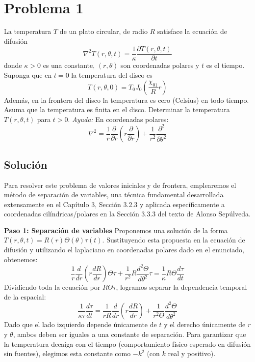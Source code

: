 \documentclass[a4paper]{article}
\begin{document}
\section{Problema 1}
La temperatura $T$ de un plato circular, de radio $R$ satisface la ecuación de difusión
$$
\nabla^2T(r,\theta,t) = \frac{1}{\kappa}\frac{\partial T(r,\theta,t)}{\partial t}
$$
donde $\kappa > 0$ es una constante, $(r,\theta)$ son coordenadas polares y $t$ es el tiempo. Suponga que en $t = 0$ la temperatura del disco es
$$T(r,\theta,0) = T_0 J_0\left(\frac{\chi_{01}}{R}r\right)$$
Además, en la frontera del disco la temperatura es cero (Celsius) en todo tiempo. Asuma que la temperatura es finita en el disco.
Determinar la temperatura $T(r,\theta,t)$ para $t > 0$.
\textit{Ayuda:} En coordenadas polares:
$$
\nabla^2 = \frac{1}{r} \frac{\partial}{\partial r}\left(r\frac{\partial}{\partial r}\right) + \frac{1}{r^2} \frac{\partial^2}{\partial \theta^2}
$$

\subsection{Solución}

Para resolver este problema de valores iniciales y de frontera, emplearemos el método de separación de variables, una técnica fundamental desarrollada extensamente en el Capítulo 3, Sección 3.2.3 y aplicada específicamente a coordenadas cilíndricas/polares en la Sección 3.3.3 del texto de Alonso Sepúlveda. 

\textbf{Paso 1: Separación de variables}
Proponemos una solución de la forma $T(r,\theta,t) = R(r)\Theta(\theta)\tau(t)$. Sustituyendo esta propuesta en la ecuación de difusión y utilizando el laplaciano en coordenadas polares dado en el enunciado, obtenemos:
$$
\frac{1}{r} \frac{d}{dr}\left(r \frac{dR}{dr}\right)\Theta\tau + \frac{1}{r^2} R \frac{d^2\Theta}{d\theta^2}\tau = \frac{1}{\kappa} R\Theta \frac{d\tau}{dt}
$$
Dividiendo toda la ecuación por $R\Theta\tau$, logramos separar la dependencia temporal de la espacial:
$$
\frac{1}{\kappa \tau} \frac{d\tau}{dt} = \frac{1}{r R} \frac{d}{dr}\left(r \frac{dR}{dr}\right) + \frac{1}{r^2 \Theta} \frac{d^2\Theta}{d\theta^2}
$$
Dado que el lado izquierdo depende únicamente de $t$ y el derecho únicamente de $r$ y $\theta$, ambos deben ser iguales a una constante de separación. Para garantizar que la temperatura decaiga con el tiempo (comportamiento físico esperado en difusión sin fuentes), elegimos esta constante como $-k^2$ (con $k$ real y positivo).
\end{document}
